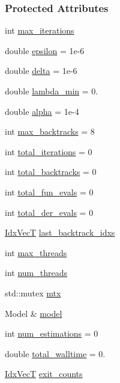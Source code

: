 \subsubsection*{Protected Attributes}
\begin{DoxyCompactItemize}
\item 
int \hyperlink{classmappel_1_1IterativeMaximizer_ac888935f332b069836a559f44cd267c7}{max\+\_\+iterations}
\item 
double \hyperlink{classmappel_1_1IterativeMaximizer_ae727ea0e3cab3924d21ebe9c12fec314}{epsilon} = 1e-\/6
\item 
double \hyperlink{classmappel_1_1IterativeMaximizer_a0aab5231009711a55325adbeb7d5f282}{delta} = 1e-\/6
\item 
double \hyperlink{classmappel_1_1IterativeMaximizer_a871576ad8b418a1f05df6a9eba2c60ab}{lambda\+\_\+min} = 0.
\item 
double \hyperlink{classmappel_1_1IterativeMaximizer_ae8a6d8e5c263fa60aaf39fbf96cd6c48}{alpha} = 1e-\/4
\item 
int \hyperlink{classmappel_1_1IterativeMaximizer_a72148f311140be63ded9794921a7c112}{max\+\_\+backtracks} = 8
\item 
int \hyperlink{classmappel_1_1IterativeMaximizer_a8d344b09841e61cc726dc430d8451044}{total\+\_\+iterations} = 0
\item 
int \hyperlink{classmappel_1_1IterativeMaximizer_a752717a4e69ba7cd44a6167d0cbdb242}{total\+\_\+backtracks} = 0
\item 
int \hyperlink{classmappel_1_1IterativeMaximizer_afbb76db27b845efa8e958611dd3c8d3c}{total\+\_\+fun\+\_\+evals} = 0
\item 
int \hyperlink{classmappel_1_1IterativeMaximizer_a76de3653a5f2c200ad6865372eb9c154}{total\+\_\+der\+\_\+evals} = 0
\item 
\hyperlink{namespacemappel_ac63743dcd42180127307cd0e4ecdd784}{Idx\+VecT} \hyperlink{classmappel_1_1IterativeMaximizer_a80280950668483fccde55616ecc38b7b}{last\+\_\+backtrack\+\_\+idxs}
\item 
int \hyperlink{classmappel_1_1ThreadedEstimator_a31391f8aaab3484f58bfdedbdb22be42}{max\+\_\+threads}
\item 
int \hyperlink{classmappel_1_1ThreadedEstimator_a6afa05d7d971f3317ce1602de853123b}{num\+\_\+threads}
\item 
std\+::mutex \hyperlink{classmappel_1_1ThreadedEstimator_a4538fd0860243430bfd47e8064c8cfe4}{mtx}
\item 
Model \& \hyperlink{classmappel_1_1Estimator_a8322546d87ccdf01f8b0dcd9dae509f0}{model}
\item 
int \hyperlink{classmappel_1_1Estimator_ab15b88435d6c50a68fac84465d950b12}{num\+\_\+estimations} = 0
\item 
double \hyperlink{classmappel_1_1Estimator_a5a408458a111c5222193871fa6bb6644}{total\+\_\+walltime} = 0.
\item 
\hyperlink{namespacemappel_ac63743dcd42180127307cd0e4ecdd784}{Idx\+VecT} \hyperlink{classmappel_1_1Estimator_a490b648fdbd7ddae7ce41fbf26e29b48}{exit\+\_\+counts}
\end{DoxyCompactItemize}


